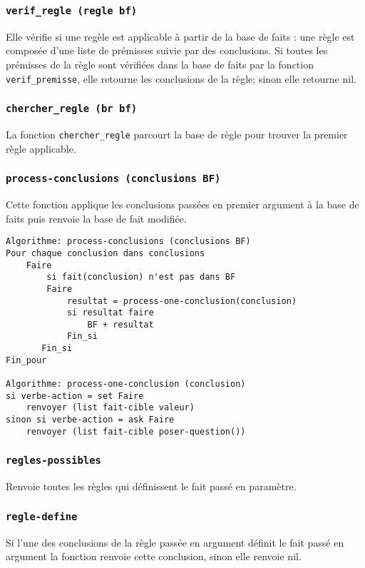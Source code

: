 \documentclass[a4paper, 12pt, final]{article}
\begin{document}
\subsubsection{\texttt{verif\_regle (regle bf)}}
Elle vérifie si une regèle est applicable à partir de la base de faits :
une règle est composée d'une liste de prémisses suivie par des
conclusions. Si toutes les prémisses de la règle sont vérifiées dans
la base de faits par la fonction \texttt{verif\_premisse}, elle
retourne les conclusions de la règle; sinon elle retourne nil.

\subsubsection{\texttt{chercher\_regle (br bf)}}
La fonction \texttt{chercher\_regle} parcourt la base de règle pour trouver la premier règle applicable.

\subsubsection{\texttt{process-conclusions (conclusions BF)}}
Cette fonction applique les conclusions passées en premier argument à
la base de faits puis renvoie la base de fait modifiée.

\begin{verbatim}
Algorithme: process-conclusions (conclusions BF) 
Pour chaque conclusion dans conclusions
    Faire
        si fait(conclusion) n'est pas dans BF
        Faire
            resultat = process-one-conclusion(conclusion)
            si resultat faire
                BF + resultat
            Fin_si
       Fin_si
Fin_pour

Algorithme: process-one-conclusion (conclusion) 
si verbe-action = set Faire
    renvoyer (list fait-cible valeur)
sinon si verbe-action = ask Faire
    renvoyer (list fait-cible poser-question())
\end{verbatim}

\subsubsection{\texttt{regles-possibles}}
Renvoie toutes les règles qui définissent le fait passé en paramètre.

\subsubsection{\texttt{regle-define}}
Si l'une des conclusions de la règle passée en argument définit le
fait passé en argument la fonction renvoie cette conclusion, sinon
elle renvoie nil.
\end{document}
